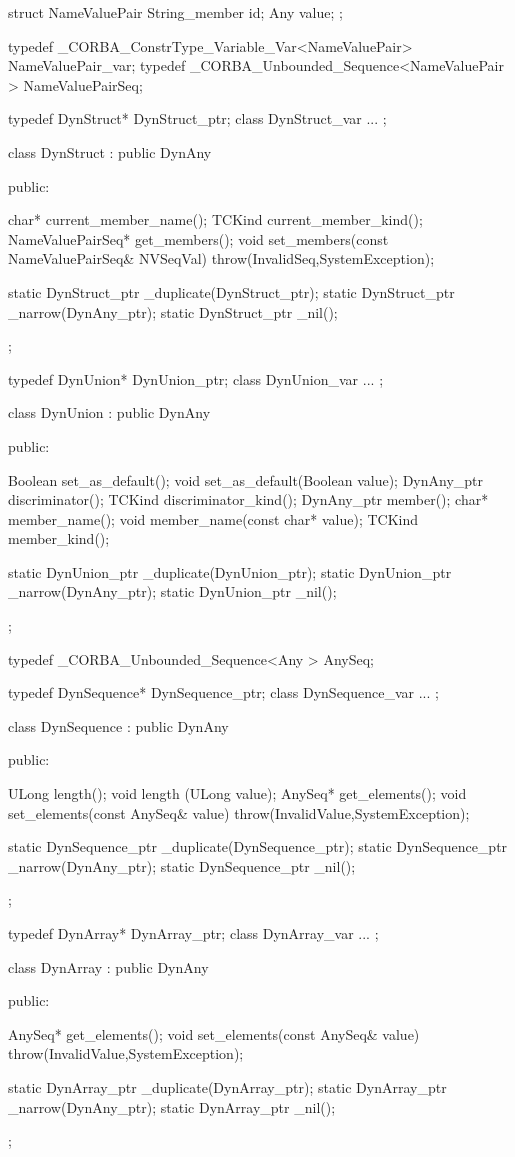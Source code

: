 \documentclass[11pt,twoside,a4paper]{book}
\begin{document}
\begin{cxxlisting}
struct NameValuePair {
  String_member id;
  Any value;
};

typedef _CORBA_ConstrType_Variable_Var<NameValuePair> NameValuePair_var;
typedef _CORBA_Unbounded_Sequence<NameValuePair > NameValuePairSeq;

typedef DynStruct* DynStruct_ptr;
class DynStruct_var { ... };

class DynStruct :  public DynAny {
public:

  char*  current_member_name();
  TCKind current_member_kind();
  NameValuePairSeq* get_members();
  void set_members(const NameValuePairSeq& NVSeqVal)
                   throw(InvalidSeq,SystemException);

  static DynStruct_ptr _duplicate(DynStruct_ptr);
  static DynStruct_ptr _narrow(DynAny_ptr);
  static DynStruct_ptr _nil();
};

typedef DynUnion* DynUnion_ptr;
class DynUnion_var { ... };

class DynUnion :  public DynAny {
public:

  Boolean set_as_default();
  void set_as_default(Boolean value);
  DynAny_ptr discriminator();
  TCKind discriminator_kind();
  DynAny_ptr member();
  char*  member_name();
  void member_name(const char* value);
  TCKind member_kind();

  static DynUnion_ptr _duplicate(DynUnion_ptr);
  static DynUnion_ptr _narrow(DynAny_ptr);
  static DynUnion_ptr _nil();
};

typedef _CORBA_Unbounded_Sequence<Any > AnySeq;

typedef DynSequence* DynSequence_ptr;
class DynSequence_var { ... };

class DynSequence :  public DynAny {
public:

  ULong length();
  void length (ULong value);
  AnySeq* get_elements();
  void set_elements(const AnySeq& value) throw(InvalidValue,SystemException);

  static DynSequence_ptr _duplicate(DynSequence_ptr);
  static DynSequence_ptr _narrow(DynAny_ptr);
  static DynSequence_ptr _nil();
};

typedef DynArray* DynArray_ptr;
class DynArray_var { ... };

class DynArray : public DynAny {
public:

  AnySeq* get_elements();
  void set_elements(const AnySeq& value) throw(InvalidValue,SystemException);

  static DynArray_ptr _duplicate(DynArray_ptr);
  static DynArray_ptr _narrow(DynAny_ptr);
  static DynArray_ptr _nil();
};
\end{cxxlisting}
\end{document}

